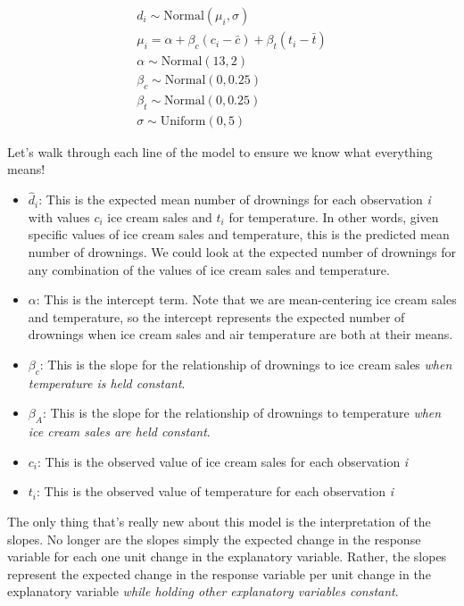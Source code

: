 \documentclass[
]{book}
\begin{document}
\[
\begin{array}{l}
d_i \sim \mathrm{Normal}(\mu_i, \sigma) \\
\mu_i = \alpha + \beta_{c} (c_i-\bar{c}) + \beta_t (t_i-\bar{t})\\ 
\alpha \sim \mathrm{Normal}(13, 2) \\
\beta_c \sim \mathrm{Normal}(0, 0.25) \\
\beta_t \sim \mathrm{Normal}(0, 0.25) \\
\sigma \sim \mathrm{Uniform}(0, 5)
\end{array}
\]

Let's walk through each line of the model to ensure we know what everything means!

\begin{itemize}
\item
  \(\hat{d}_i\): This is the expected mean number of drownings for each observation \emph{i} with values \(c_i\) ice cream sales and \(t_i\) for temperature. In other words, given specific values of ice cream sales and temperature, this is the predicted mean number of drownings. We could look at the expected number of drownings for any combination of the values of ice cream sales and temperature.
\item
  \(\alpha\): This is the intercept term. Note that we are mean-centering ice cream sales and temperature, so the intercept represents the expected number of drownings when ice cream sales and air temperature are both at their means.
\item
  \(\beta_c\): This is the slope for the relationship of drownings to ice cream sales \emph{when temperature is held constant}.
\item
  \(\beta_A\): This is the slope for the relationship of drownings to temperature \emph{when ice cream sales are held constant}.
\item
  \(c_i\): This is the observed value of ice cream sales for each observation \emph{i}
\item
  \(t_i\): This is the observed value of temperature for each observation \emph{i}
\end{itemize}

The only thing that's really new about this model is the interpretation of the slopes. No longer are the slopes simply the expected change in the response variable for each one unit change in the explanatory variable. Rather, the slopes represent the expected change in the response variable per unit change in the explanatory variable \emph{while holding other explanatory variables constant}.
\end{document}
